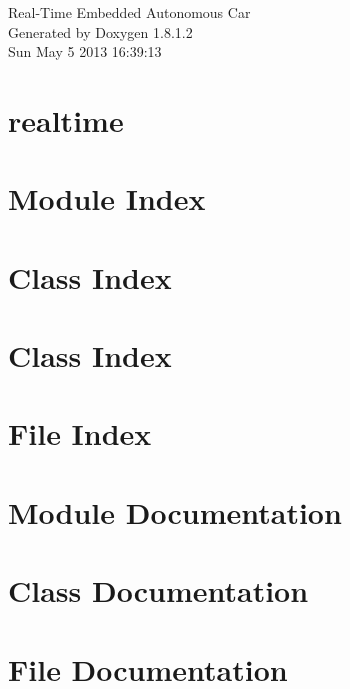 \documentclass{book}
\begin{document}
\hypersetup{pageanchor=false,citecolor=blue}
\begin{titlepage}
\vspace*{7cm}
\begin{center}
{\Large Real-\/\-Time Embedded Autonomous Car }\\
\vspace*{1cm}
{\large Generated by Doxygen 1.8.1.2}\\
\vspace*{0.5cm}
{\small Sun May 5 2013 16:39:13}\\
\end{center}
\end{titlepage}
\clearemptydoublepage
{}
\tableofcontents
\clearemptydoublepage
{}
\hypersetup{pageanchor=true,citecolor=blue}
\chapter{realtime}
\label{md_README}
\hypertarget{md_README}{}

\chapter{Module Index}

\chapter{Class Index}

\chapter{Class Index}

\chapter{File Index}

\chapter{Module Documentation}







\chapter{Class Documentation}


















\chapter{File Documentation}

\printindex
\end{document}
